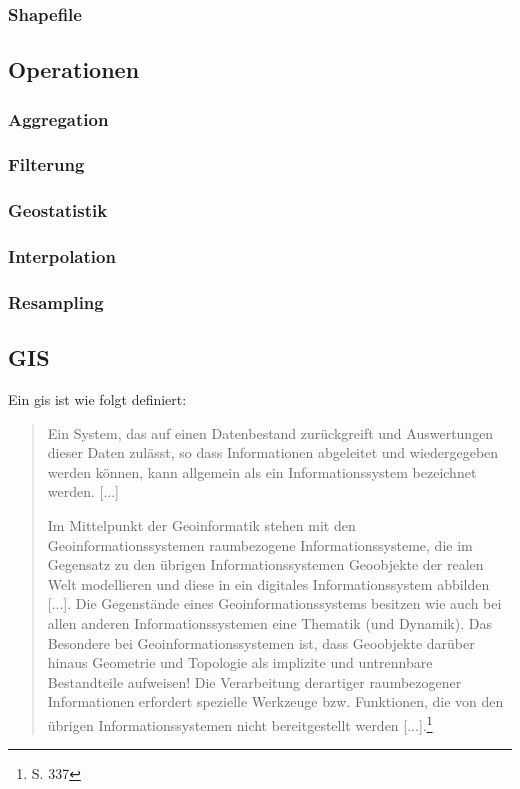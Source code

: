 \subsubsection{Shapefile}

\subsection{Operationen}

\subsubsection{Aggregation}

\subsubsection{Filterung}

\subsubsection{Geostatistik}

\subsubsection{Interpolation}

\subsubsection{Resampling}


\subsection{GIS}
\label{grundlagen:gis}

Ein \Gls{gis} ist wie folgt definiert:
\begin{quote}
Ein System,  das  auf einen Datenbestand zurückgreift und Auswertungen dieser Daten zulässt,  so dass Informationen abgeleitet und wiedergegeben werden können,  kann  allgemein  als  ein  Informationssystem  bezeichnet  werden. [...]

Im Mittelpunkt  der  Geoinformatik  stehen  mit den  Geoinformationssystemen raumbezogene Informationssysteme, die im Gegensatz zu den übrigen Informationssystemen Geoobjekte  der realen Welt modellieren und diese in ein digitales Informationssystem abbilden [...]. Die Gegenstände eines Geoinformationssystems  besitzen  wie  auch  bei  allen  anderen  Informationssystemen  eine 
Thematik (und Dynamik). Das Besondere bei Geoinformationssystemen ist, dass Geoobjekte darüber hinaus Geometrie und Topologie als implizite und untrennbare Bestandteile aufweisen!  Die Verarbeitung derartiger raumbezogener Informationen erfordert spezielle Werkzeuge bzw. Funktionen, die von den übrigen Informationssystemen nicht bereitgestellt werden [...].\footnote{\cite{book:gi-theopluspraxis3} S. 337}
\end{quote}

